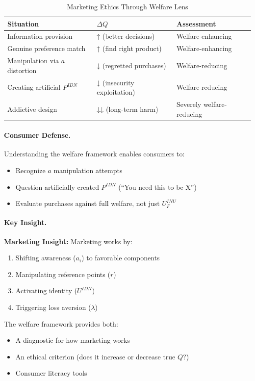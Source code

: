 \begin{table}[htbp]
\centering
\caption{Marketing Ethics Through Welfare Lens}
\label{tab:marketing-ethics}
\renewcommand{\arraystretch}{1.3}
\begin{tabular}{@{}lll@{}}
\toprule
\textbf{Situation} & \textbf{$\Delta Q$} & \textbf{Assessment} \\
\midrule
Information provision & ↑ (better decisions) & Welfare-enhancing \\
Genuine preference match & ↑ (find right product) & Welfare-enhancing \\
Manipulation via $a$ distortion & ↓ (regretted purchases) & Welfare-reducing \\
Creating artificial $P^{IDN}$ & ↓ (insecurity exploitation) & Welfare-reducing \\
Addictive design & ↓↓ (long-term harm) & Severely welfare-reducing \\
\bottomrule
\end{tabular}
\end{table}

\paragraph{Consumer Defense.}
Understanding the welfare framework enables consumers to:
\begin{itemize}
\item Recognize $a$ manipulation attempts
\item Question artificially created $P^{IDN}$ (``You need this to be X'')
\item Evaluate purchases against full welfare, not just $U^{INU}_{F}$
\end{itemize}

\paragraph{Key Insight.}
\begin{tcolorbox}[colback=yellow!10!white, colframe=yellow!50!black]
\textbf{Marketing Insight:}
Marketing works by:
\begin{enumerate}
\item Shifting awareness ($a_i$) to favorable components
\item Manipulating reference points ($r$)
\item Activating identity ($U^{IDN}$)
\item Triggering loss aversion ($\lambda$)
\end{enumerate}
The welfare framework provides both:
\begin{itemize}
\item A diagnostic for how marketing works
\item An ethical criterion (does it increase or decrease true $Q$?)
\item Consumer literacy tools
\end{itemize}
\end{tcolorbox}

